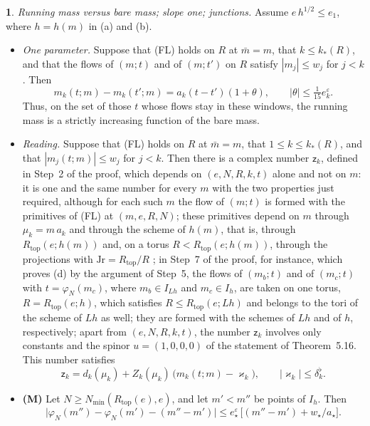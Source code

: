 \documentclass[11pt]{amsart}
\newcommand{\namedhead}{}
\theoremstyle{definition}
\newtheorem*{namedinner}{\namedhead}
\newenvironment{named}[1]{\renewcommand{\namedhead}{#1}\begin{namedinner}}{\end{namedinner}}
\begin{document}
\begin{named}{Proposition 6.3}
\emph{Running mass versus bare mass; slope one; junctions.}
Assume $e\,h^{1/2}\le e_1$, where $h=h(m)$ in (a) and (b).
\begin{itemize}
\item[(a)] \emph{One parameter.}
Suppose that (FL) holds on $R$ at $\bar m=m$, that $k\le k_*(R)$, and that the flows of $(m;t)$ and of $(m;t')$ on $R$ satisfy $|m_j|\le w_j$ for $j<k$.
Then
\begin{equation*}
m_k(t;m)-m_k(t';m)=a_k(t-t')(1+\theta),\qquad|\theta|\le\tfrac1{15}e_k^{\varepsilon}.
\end{equation*}
Thus, on the set of those $t$ whose flows stay in these windows, the running mass is a strictly increasing function of the bare mass.
\item[(b)] \emph{Reading.}
Suppose that (FL) holds on $R$ at $\bar m=m$, that $1\le k\le k_*(R)$, and that $|m_j(t;m)|\le w_j$ for $j<k$.
Then there is a complex number $\mathsf z_k$, defined in Step~2 of the proof, which depends on $(e,N,R,k,t)$ alone and not on $m$:
it is one and the same number for every $m$ with the two properties just required, although for each such $m$ the flow of $(m;t)$ is formed with the primitives of (FL) at $(m,e,R,N)$;
these primitives depend on $m$ through $\mu_k=m\,a_k$ and through the scheme of $h(m)$, that is, through $R_{\mathrm{top}}(e;h(m))$ and, on a torus $R<R_{\mathrm{top}}(e;h(m))$, through the projections with $\mathrm{Jr}=R_{\mathrm{top}}/R$ \cite[Section~G4.0.1]{QEDIII};
in Step~7 of the proof, for instance, which proves (d) by the argument of Step~5, the flows of $(m_b;t)$ and of $(m_c;t)$ with $t=\varphi_N(m_c)$, where $m_b\in I_{Lh}$ and $m_c\in I_h$, are taken on one torus, $R=R_{\mathrm{top}}(e;h)$, which satisfies $R\le R_{\mathrm{top}}(e;Lh)$ and belongs to the tori of the scheme of $Lh$ as well;
they are formed with the schemes of $Lh$ and of $h$, respectively;
apart from $(e,N,R,k,t)$, the number $\mathsf z_k$ involves only constants and the spinor $u=(1,0,0,0)$ of the statement of Theorem~5.16.
This number satisfies
\begin{equation*}
\mathsf z_k=d_k(\mu_k)+Z_k(\mu_k)\,\bigl(m_k(t;m)-\varkappa_k\bigr),\qquad|\varkappa_k|\le\delta_k^\flat.
\end{equation*}
\item[(c)] \textbf{(M)}
Let $N\ge N_{\min}(R_{\mathrm{top}}(e),e)$, and let $m'<m''$ be points of $I_h$.
Then
\begin{equation*}
\bigl|\varphi_N(m'')-\varphi_N(m')-(m''-m')\bigr|\le e_\star^{\varepsilon}\,\bigl[(m''-m')+w_\star/a_\star\bigr].

\end{equation*}
\end{itemize}
\end{named}
\end{document}
